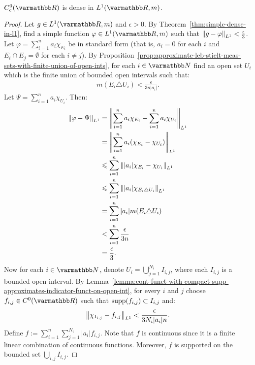 \begin{theorem}
    $C_c^0(\bfR)$ is dense in $L^1(\bfR,m)$.
\end{theorem}
    \begin{proof}
        Let $g \in L^1(\bfR,m)$ and $\epsilon > 0$. By Theorem~\ref{thm:simple-dense-in-l1}, find a simple function $\varphi \in L^1(\bfR,m)$ such that $\left\lVert g - \varphi \right\rVert_{L^1} < \frac{\epsilon}{3}$. Let $\varphi = \sum_{i = 1}^n a_i \chi_{E_i}$ be in standard form (that is, $a_i = 0$ for each $i$ and $E_i \cap E_j = \emptyset$ for each $i \neq j$). By Proposition~\ref{prop:approximate-leb-stielt-meas-sets-with-finite-union-of-open-ints}, for each $i \in \bfN$ find an open set $U_i$ which is the finite union of bounded open intervals such that:
            \begin{equation*}
            \begin{split}
                m(E_i \triangle U_i) < \frac{\epsilon}{3n |a_i|}.
            \end{split}
            \end{equation*}
        Let $\Psi = \sum_{i = 1}^n a_i \chi_{U_i}$. Then:
            \begin{equation*}
            \begin{split}
                \left\lVert \varphi - \Psi \right\rVert_{L^1} 
                & = \left\lVert \sum_{i = 1}^n a_i \chi_{E_i} - \sum_{i = 1}^n a_i \chi_{U_i} \right\rVert_{L^1} \\
                & = \left\lVert \sum_{i = 1}^n a_i(\chi_{E_i} - \chi_{U_i}) \right\rVert_{L^1} \\
                & \leqslant  \sum_{i = 1}^n \left\lVert |a_i|\chi_{E_i} - \chi_{U_i} \right\rVert_{L^1} \\
                & \leqslant  \sum_{i = 1}^n \left\lVert |a_i|\chi_{E_i \triangle U_i} \right\rVert_{L^1} \\
                & = \sum_{i = 1}^n |a_i| m(E_i \triangle U_i) \\
                & < \sum_{i = 1}^n \frac{\epsilon}{3n} \\
                & = \frac{\epsilon}{3}.
            \end{split}
            \end{equation*}
        Now for each $i \in \bfN$, denote $U_i = \bigcup_{j = 1}^{N_i}I_{i,j}$, where each $I_{i,j}$ is a bounded open interval. By Lemma~\ref{lemma:cont-funct-with-compact-supp-approximates-indicator-funct-on-open-int}, for every $i$ and $j$ choose $f_{i,j} \in C^0(\bfR)$ such that $\operatorname{supp}(f_{i,j}) \subset I_{i,j}$ and:
            \begin{equation*}
            \begin{split}
                \left\lVert \chi_{I_{i,j}}  - f_{i,j}\right\rVert_{L^1} < \frac{\epsilon}{3N_i |a_i| n}.
            \end{split}
            \end{equation*}
        Define $f:= \sum_{i = 1}^n \sum_{j = 1}^{N_i}|a_i| f_{i,j}$. Note that $f$ is continuous since it is a finite linear combination of continuous functions. Moreover, $f$ is supported on the bounded set $\bigcup_{i,j}I_{i,j}$.
    \end{proof}
